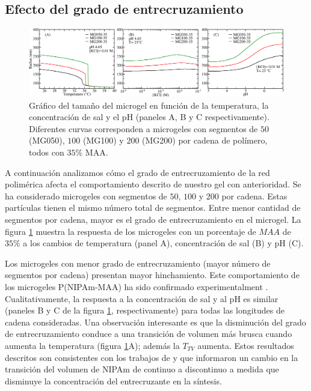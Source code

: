 \subsection{Efecto del grado de entrecruzamiento} \label{sec:gel:entrecruzamiento}


\begin{figure}[!tb]
	\centering
	\includegraphics[width=1\linewidth]{Figures/graph-gel/R-all_xlink.png}
	\caption{Gr\'afico del tama\~no del microgel en funci\'on de la temperatura, la concentraci\'on de sal y el pH (paneles A, B y C respectivamente).
		Diferentes curvas corresponden a microgeles con segmentos de $50$ (MG050), $100$ (MG100) y $200$ (MG200) por cadena de pol\'imero, todos con $35\%$ MAA.}
	\label{fig:gel:R_xlink}
\end{figure}


A continuaci\'on analizamos c\'omo el grado de entrecruzamiento de la red polim\'erica afecta el comportamiento descrito de nuestro gel con anterioridad.
Se ha considerado microgeles con segmentos de $50$, $100$ y $200$ por cadena.
Estas part\'iculas tienen el mismo n\'umero total de segmentos. Entre menor cantidad de segmentos por cadena, mayor es el grado de entrecruzamiento en el microgel.
La figura \ref{fig:gel:R_xlink} muestra la respuesta de los microgeles con un porcentaje de $MAA$ de $35\%$ a los cambios de temperatura (panel A), concentraci\'on de sal (B) y pH (C).

Los microgeles con menor grado de entrecruzamiento (mayor n\'umero de segmentos por cadena) presentan mayor hinchamiento.
Este comportamiento de los microgeles P(NIPAm-MAA) ha sido confirmado experimentalment  \cite{khan2013preparation}.
Cualitativamente, la respuesta a la concentraci\'on de sal y al pH es similar (paneles B y C de la figura \ref{fig:gel:R_xlink}, respectivamente) para todas las longitudes de cadena consideradas.
Una observaci\'on interesante es que la disminuci\'on del grado de entrecruzamiento conduce a una transici\'on de volumen m\'as brusca cuando aumenta la temperatura (figura \ref{fig:gel:R_xlink}A);
adem\'as la  $T_{TV}$ aumenta.
Estos resultados descritos son consistentes con los trabajos de \citet{li1989study} y  \citet{wu1997volume} que informaron un cambio en la transici\'on del volumen de NIPAm de continuo a discontinuo a medida que disminuye la concentraci\'on del entrecruzante en la s\'intesis.



